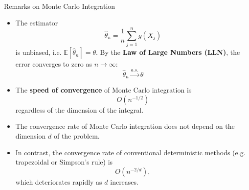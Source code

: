 \documentclass[8pt]{beamer}
\begin{document}
\begin{frame}{Remarks on Monte Carlo Integration}
\begin{itemize}
  \item The estimator 
  \begin{equation*}
  	\hat{\theta}_n = \frac{1}{n} \sum_{j=1}^n g(X_j)
  \end{equation*}
  is unbiased, i.e. $\mathbb{E}[\hat{\theta}_n] = \theta$. By the \textbf{Law of Large Numbers (LLN)}, the error converges to zero as $n \to \infty$:
  \begin{equation*}
  	\hat{\theta}_n \xrightarrow{a.s.} \theta
  \end{equation*}

  \item The \textbf{speed of convergence} of Monte Carlo integration is 
  \begin{equation*}
  O(n^{-1/2})
  \end{equation*}
  regardless of the dimension of the integral.

  \item \alert{The convergence rate of Monte Carlo integration does not depend on the dimension $d$ of the problem.}

  \item In contrast, the convergence rate of conventional deterministic methods (e.g. trapezoidal or Simpson’s rule) is 
  \begin{equation*}
  O(n^{-2/d}),
  \end{equation*}
  which deteriorates rapidly as $d$ increases.
\end{itemize}
\end{frame}
\end{document}
